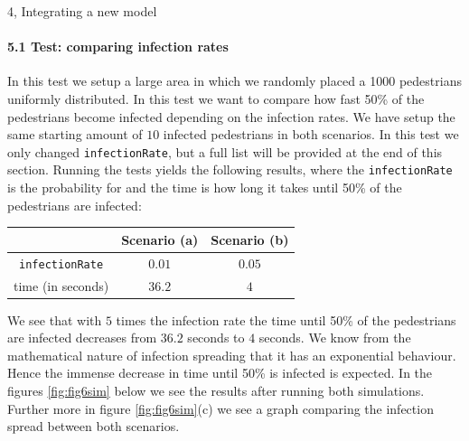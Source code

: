 \begin{task}{4, Integrating a new model}
\paragraph{5.1 Test: comparing infection rates}
In this test we setup a large area in which we randomly placed a 1000 pedestrians uniformly distributed. In this test we want to compare how fast 50\% of the pedestrians become infected depending on the infection rates. We have setup the same starting amount of $10$ infected pedestrians in both scenarios. In this test we only changed \verb+infectionRate+, but a full list will be provided at the end of this section. Running the tests yields the following results, where the \verb+infectionRate+ is the probability for and the time is how long it takes until 50\% of the pedestrians are infected:
\begin{center}
\begin{tabular}{ |c|c|c| } 
 \hline
& Scenario (a) & Scenario (b) \\
\hline
\verb+infectionRate+ & $0.01$ & $0.05$ \\
\hline
time (in seconds) & $36.2$ & $4$\\
\hline
\end{tabular}
\end{center}
We see that with $5$ times the infection rate the time until 50\% of the pedestrians are infected decreases from $36.2$ seconds to $4$ seconds. We know from the mathematical nature of infection spreading that it has an exponential behaviour. Hence the immense decrease in time until 50\% is infected is expected. In the figures \ref{fig:fig6sim} below we see the results after running both simulations. Further more in figure \ref{fig:fig6sim}(c) we see a graph comparing the infection spread between both scenarios.
\begin{figure}[H]
\centering
{}

\end{figure}
\end{task}
